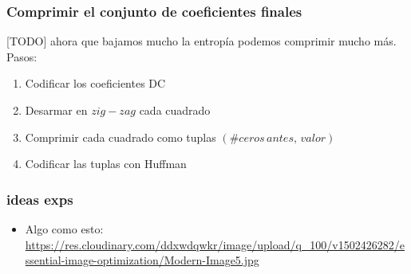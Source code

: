 \documentclass{beamer}
\begin{document}
\begin{frame}
    \frametitle{Comprimir el conjunto de coeficientes finales}

    [TODO] ahora que bajamos mucho la entropía podemos comprimir mucho más. Pasos:
    \begin{enumerate}
        \item Codificar los coeficientes DC
        \item Desarmar en $zig-zag$ cada cuadrado
        \item Comprimir cada cuadrado como tuplas $(\# ceros \, antes, \, valor)$
        \item Codificar las tuplas con Huffman

    \end{enumerate}
\end{frame}
\begin{frame}
    \frametitle{ideas exps}
    \begin{itemize}
        \item Algo como esto: 
            \url{https://res.cloudinary.com/ddxwdqwkr/image/upload/q_100/v1502426282/essential-image-optimization/Modern-Image5.jpg}
    \end{itemize}
    
\end{frame}
\end{document}
